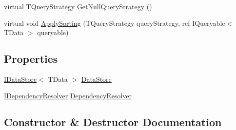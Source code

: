 \begin{DoxyCompactItemize}
\item 
virtual T\+Query\+Strategy \hyperlink{classCqrs_1_1Repositories_1_1Queries_1_1QueryBuilder_a57b32d33321cbacfc7e58fec6ba3887c_a57b32d33321cbacfc7e58fec6ba3887c}{Get\+Null\+Query\+Strategy} ()
\item 
virtual void \hyperlink{classCqrs_1_1Repositories_1_1Queries_1_1QueryBuilder_aea4b78b2633babfaea0862f2a365c7d3_aea4b78b2633babfaea0862f2a365c7d3}{Apply\+Sorting} (T\+Query\+Strategy query\+Strategy, ref I\+Queryable$<$ T\+Data $>$ queryable)
\end{DoxyCompactItemize}
\subsection*{Properties}
\begin{DoxyCompactItemize}
\item 
\hyperlink{interfaceCqrs_1_1DataStores_1_1IDataStore}{I\+Data\+Store}$<$ T\+Data $>$ \hyperlink{classCqrs_1_1Repositories_1_1Queries_1_1QueryBuilder_a8a64851b3bf82ed5d2e708cd39d71890_a8a64851b3bf82ed5d2e708cd39d71890}{Data\+Store}
\item 
\hyperlink{interfaceCqrs_1_1Configuration_1_1IDependencyResolver}{I\+Dependency\+Resolver} \hyperlink{classCqrs_1_1Repositories_1_1Queries_1_1QueryBuilder_aef22b10001de3e15a2817f8446a5b5f4_aef22b10001de3e15a2817f8446a5b5f4}{Dependency\+Resolver}
\end{DoxyCompactItemize}


\subsection{Constructor \& Destructor Documentation}
\mbox{\label{classCqrs_1_1Repositories_1_1Queries_1_1QueryBuilder_a8a7b6495f78adedc7b7a82d2c83f17d5_a8a7b6495f78adedc7b7a82d2c83f17d5}} 
